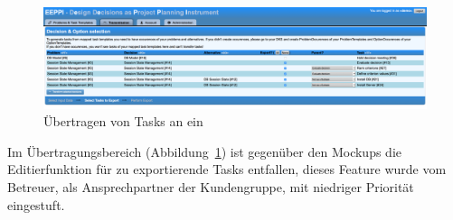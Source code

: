 			
		\begin{figure}[H]
			\centering
			\includegraphics[width=\linewidth]{tutorial/img/transmit2.png}
			\caption{Übertragen von Tasks an ein \ppt}
			\label{fig:eeppiTransmissionScreen}
		\end{figure}	
		
		Im Übertragungsbereich (Abbildung~\ref{fig:eeppiTransmissionScreen}) ist gegenüber den Mockups die Editierfunktion für zu exportierende Tasks entfallen,
		dieses Feature wurde vom Betreuer, als Ansprechpartner der Kundengruppe, mit niedriger Priorität eingestuft.
